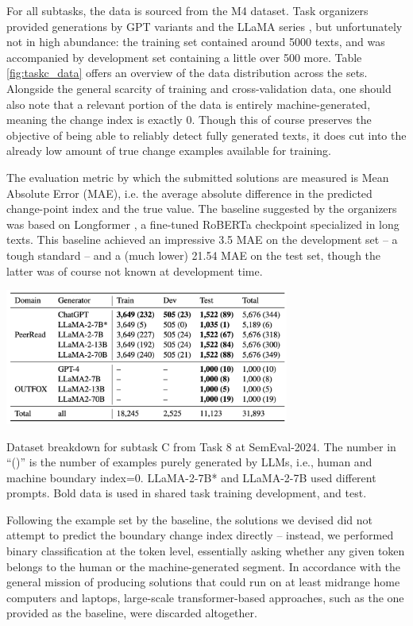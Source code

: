 For all subtasks, the data is sourced from the M4 \citep{wang-etal-2024-m4} dataset.
Task organizers provided generations by GPT variants and the LLaMA series \citep{touvron2023llama}, but unfortunately not in high abundance: the training set contained around 5000 texts, and was accompanied by development set containing a little over 500 more.
Table \ref{fig:taskc_data} offers an overview of the data distribution across the sets.
Alongside the general scarcity of training and cross-validation data, one should also note that a relevant portion of the data is entirely machine-generated, meaning the change index is exactly 0.
Though this of course preserves the objective of being able to reliably detect fully generated texts, it does cut into the already low amount of true change examples available for training.

The evaluation metric by which the submitted solutions are measured is Mean Absolute Error (MAE), i.e. the average absolute difference in the predicted change-point index and the true value.
The baseline suggested by the organizers was based on Longformer \citep{beltagy2020longformerlongdocumenttransformer}, a fine-tuned RoBERTa checkpoint specialized in long texts.
This baseline achieved an impressive 3.5 MAE on the development set -- a tough standard -- and a (much lower) 21.54 MAE on the test set, though the latter was of course not known at development time.


\begin{table}[h]
    \centering
    \includegraphics[width=0.7\textwidth]{assets/subtaskc-data.png}
    \caption{
        Dataset breakdown for subtask C from Task 8 at SemEval-2024.
        The number in “()” is the number of examples purely generated by LLMs, i.e., human and machine boundary index=0.
        LLaMA-2-7B* and LLaMA-2-7B used different prompts. Bold data is used in shared task training development, and test.
    }
    \label{fig:taskc_data}
\end{table}

Following the example set by the baseline, the solutions we devised did not attempt to predict the boundary change index directly -- instead, we performed binary classification at the token level, essentially asking whether any given token belongs to the human or the machine-generated segment.
In accordance with the general mission of producing solutions that could run on at least midrange home computers and laptops, large-scale transformer-based approaches, such as the one provided as the baseline, were discarded altogether.

